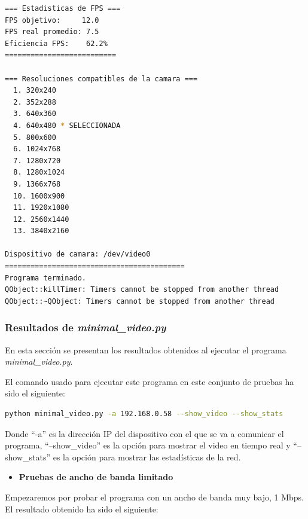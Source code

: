 \begin{adjustbox}{max width=\textwidth}
\begin{lstlisting}[language=bash,basicstyle=\ttfamily\scriptsize]
=== Estadisticas de FPS ===
FPS objetivo:     12.0
FPS real promedio: 7.5
Eficiencia FPS:    62.2%
==========================

=== Resoluciones compatibles de la camara ===
  1. 320x240
  2. 352x288
  3. 640x360
  4. 640x480 * SELECCIONADA
  5. 800x600
  6. 1024x768
  7. 1280x720
  8. 1280x1024
  9. 1366x768
  10. 1600x900
  11. 1920x1080
  12. 2560x1440
  13. 3840x2160

Dispositivo de camara: /dev/video0
==========================================
Programa terminado.
QObject::killTimer: Timers cannot be stopped from another thread
QObject::~QObject: Timers cannot be stopped from another thread
\end{lstlisting}
\end{adjustbox}

\newpage

\subsubsection{Resultados de \textit{minimal\_video.py}}

En esta sección se presentan los resultados obtenidos al ejecutar el programa \textit{minimal\_video.py}.

\vspace{\baselineskip}
El comando usado para ejecutar este programa en este conjunto de pruebas ha sido el siguiente:
\begin{lstlisting}[language=bash]
python minimal_video.py -a 192.168.0.58 --show_video --show_stats
\end{lstlisting}
Donde ``-a'' es la dirección IP del dispositivo con el que se va a comunicar el programa, ``--show\_video'' es la opción para mostrar el video en tiempo real y ``--show\_stats'' es la opción para mostrar las estadísticas de la red.

\vspace{\baselineskip}
\begin{itemize}
    \item \textbf{Pruebas de ancho de banda limitado}
\end{itemize}

Empezaremos por probar el programa con un ancho de banda muy bajo, 1 Mbps. El resultado obtenido ha sido el siguiente:

